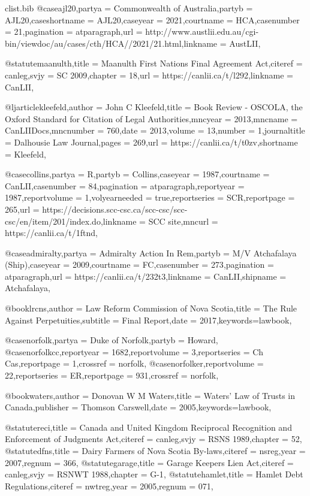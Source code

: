 \begin{filecontents*}[overwrite]{clist\jobname.bib}
@case{ajl20,partya =  {Commonwealth of Australia},partyb =  {AJL20},caseshortname =  {AJL20},caseyear =  {2021},courtname =  {HCA},casenumber =  {21},pagination =  {atparagraph},url =  {http://www.austlii.edu.au/cgi-bin/viewdoc/au/cases/cth/HCA//2021/21.html},linkname =  {AustLII},}

@statute{maanulth,title =  {Maanulth First Nations Final Agreement Act},citeref =  {canleg},svjy =  {SC 2009},chapter =  {18},url =  {https://canlii.ca/t/l292},linkname =  {CanLII},}

@ljarticle{kleefeld,author =  {John C Kleefeld},title =  {Book Review - OSCOLA, the Oxford Standard for Citation of Legal Authorities},mncyear =  {2013},mncname =  {CanLIIDocs},mncnumber =  {760},date =  {2013},volume =  {13},number =  {1},journaltitle =  {Dalhousie Law Journal},pages =  {269},url =  {https://canlii.ca/t/t0zv},shortname =  {Kleefeld},}

@case{collins,partya =  {R},partyb =  {Collins},caseyear =  {1987},courtname =  {CanLII},casenumber =  {84},pagination =  {atparagraph},reportyear =  {1987},reportvolume =  {1},volyearneeded =  {true},reportseries =  {SCR},reportpage =  {265},url =  {https://decisions.scc-csc.ca/scc-csc/scc-csc/en/item/201/index.do},linkname =  {SCC site},mncurl =  {https://canlii.ca/t/1ftnd},}

@case{admiralty,partya =  {Admiralty Action In Rem},partyb =  {M/V Atchafalaya (Ship)},caseyear =  {2009},courtname =  {FC},casenumber =  {273},pagination =  {atparagraph},url =  {https://canlii.ca/t/232t3},linkname =  {CanLII},shipname =  {Atchafalaya},}


@book{lrcns,author =  {{Law Reform Commission of Nova Scotia}},title =  {The Rule Against Perpetuities},subtitle =  {Final Report},date =  {2017},keywords={lawbook},}

@case{norfolk,partya =  {Duke of Norfolk},partyb =  {Howard},}
@case{norfolkcc,reportyear =  {1682},reportvolume =  {3},reportseries =  {Ch Cas},reportpage =  {1},crossref =  {norfolk},}
@case{norfolker,reportvolume =  {22},reportseries =  {ER},reportpage =  {931},crossref =  {norfolk},}


@book{waters,author =  {Donovan W M Waters},title =  {Waters' Law of Trusts in Canada},publisher =  {Thomson Carswell},date =  {2005},keywords={lawbook},}

@statute{reci,title =  {Canada and United Kingdom Reciprocal Recognition and Enforcement of Judgments Act},citeref =  {canleg},svjy =  {RSNS 1989},chapter =  {52},}
@statute{dfns,title =  {Dairy Farmers of Nova Scotia By-laws},citeref =  {nsreg},year =  {2007},regnum =  {366},}
@statute{garage,title =  {Garage Keepers Lien Act},citeref =  {canleg},svjy =  {RSNWT 1988},chapter =  {G-1},}
@statute{hamlet,title =  {Hamlet Debt Regulations},citeref =  {nwtreg},year =  {2005},regnum =  {071},}



\end{filecontents*}
